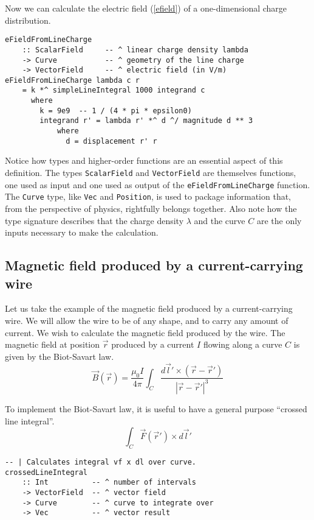 \documentclass[11pt]{article}
\newcommand{\abs}[1]{\left| #1 \right|}
\begin{document}
Now we can calculate the electric field (\ref{efield}) of a one-dimensional charge distribution.
\begin{verbatim}
eFieldFromLineCharge
    :: ScalarField     -- ^ linear charge density lambda
    -> Curve           -- ^ geometry of the line charge
    -> VectorField     -- ^ electric field (in V/m)
eFieldFromLineCharge lambda c r
    = k *^ simpleLineIntegral 1000 integrand c
      where
        k = 9e9  -- 1 / (4 * pi * epsilon0)
        integrand r' = lambda r' *^ d ^/ magnitude d ** 3
            where
              d = displacement r' r
\end{verbatim}

Notice how types and higher-order functions are an essential aspect of
this definition.  The types \verb|ScalarField| and \verb|VectorField|
are themselves functions, one used as input and one used as output
of the \verb|eFieldFromLineCharge| function.  The \verb|Curve|
type, like \verb|Vec| and \verb|Position|, is used to package
information that, from the perspective of physics, rightfully
belongs together.
Also note how the type signature describes that the charge density
$\lambda$ and the curve $C$ are the only inputs necessary to make the
calculation.

\subsection{Magnetic field produced by a current-carrying wire}

Let us take the example of the magnetic field produced by
a current-carrying wire.  We will allow the wire to be of any
shape, and to carry any amount of current.  We wish to calculate
the magnetic field produced by the wire.
The magnetic field at position $\vec{r}$ produced by a current $I$ flowing along a curve $C$ is
given by the Biot-Savart law.
\begin{equation}
\vec{B}(\vec{r}) = \frac{\mu_0 I}{4 \pi} \int_C \frac{d\vec{l}' \times (\vec{r} - \vec{r}')}{\abs{\vec{r} - \vec{r}'}^3}
\label{biotsavart}
\end{equation}

To implement the Biot-Savart law, it is useful to have a
general purpose ``crossed line integral''.
\[
\int_C \vec{F}(\vec{r}') \times d\vec{l}'
\]
\begin{verbatim}
-- | Calculates integral vf x dl over curve.
crossedLineIntegral
    :: Int          -- ^ number of intervals
    -> VectorField  -- ^ vector field
    -> Curve        -- ^ curve to integrate over
    -> Vec          -- ^ vector result
\end{verbatim}
\end{document}
